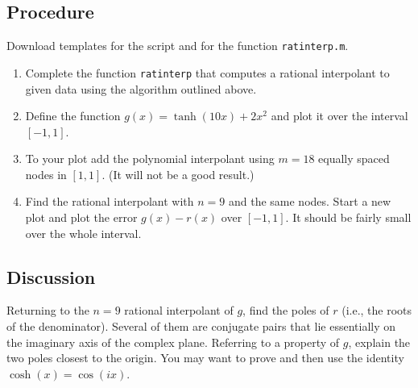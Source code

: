 \documentclass[11pt,twoside]{article}
\begin{document}
\subsection*{Procedure}

Download templates for the script and for the function \texttt{ratinterp.m}.

\begin{enumerate}
    \item Complete the function \texttt{ratinterp} that computes a rational interpolant to given data using the algorithm outlined above. 
    \item Define the function $g(x) = \tanh(10x) + 2x^2$ and plot it over the interval $[-1,1]$.
    \item To your plot add the polynomial interpolant using $m=18$ equally spaced nodes in $[1,1]$. (It will not be a good result.)
    \item Find the rational interpolant with $n=9$ and the same nodes. Start a new plot and plot the error $g(x)-r(x)$ over $[-1,1]$. It should be fairly small over the whole interval.
\end{enumerate}

\subsection*{Discussion}

Returning to the $n=9$ rational interpolant of $g$, find the poles of $r$ (i.e., the roots of the denominator). Several of them are conjugate pairs that lie essentially on the imaginary axis of the complex plane. Referring to a property of $g$, explain the two poles closest to the origin. You may want to prove and then use the identity $\cosh(x)=\cos(ix)$. 
\end{document}
